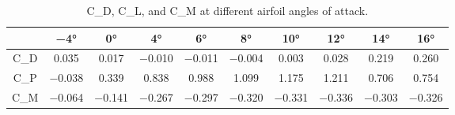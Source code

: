 \begin{table}[htpb]
    \caption{\gls{C_D}, \gls{C_L}, and \gls{C_M} at different airfoil angles of attack.}
    \label{tab:CD_CL_CM_data}
    \centering
    \begin{tabular}{cccccccccc}
        \toprule
        & \num{-4}\unit{\degree} & \num{0}\unit{\degree} & \num{4}\unit{\degree} & \num{6}\unit{\degree} & \num{8}\unit{\degree} & \num{10}\unit{\degree} & \num{12}\unit{\degree} & \num{14}\unit{\degree} & \num{16}\unit{\degree} \\
        \midrule
        \gls{C_D} & \num{0.035} & \num{0.017} & \num{-0.010} & \num{-0.011} & \num{-0.004} & \num{0.003} & \num{0.028} & \num{0.219} & \num{0.260} \\
        \gls{C_P}  & \num{-0.038} & \num{0.339} & \num{0.838} & \num{0.988} & \num{1.099} & \num{1.175} & \num{1.211} & \num{0.706} & \num{0.754} \\
		\gls{C_M} & \num{-0.064} & \num{-0.141} & \num{-0.267} & \num{-0.297} & \num{-0.320} & \num{-0.331} & \num{-0.336} & \num{-0.303} & \num{-0.326} \\
        \bottomrule
    \end{tabular}
    \vspace*{7in}
\end{table}